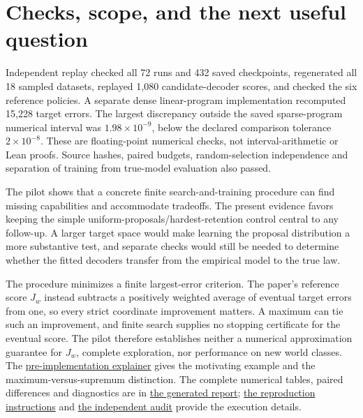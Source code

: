 \documentclass[11pt]{article}
\begin{document}
\section{Checks, scope, and the next useful question}

Independent replay checked all 72 runs and 432 saved checkpoints, regenerated
all 18 sampled datasets, replayed 1,080 candidate-decoder scores, and checked the
six reference policies. A separate dense linear-program implementation
recomputed 15,228 target errors. The largest discrepancy outside the saved
sparse-program numerical interval was $1.98\times10^{-9}$, below the declared
comparison tolerance $2\times10^{-8}$. These are floating-point numerical
checks, not interval-arithmetic or Lean proofs. Source hashes, paired budgets,
random-selection independence and separation of training from true-model
evaluation also passed.

The pilot shows that a concrete finite search-and-training procedure can find
missing capabilities and accommodate tradeoffs. The present evidence favors
keeping the simple uniform-proposals/hardest-retention control central to any
follow-up. A larger target space would make learning the proposal distribution
a more substantive test, and separate checks would still be needed to determine
whether the fitted decoders transfer from the empirical model to the true law.

The procedure minimizes a finite largest-error criterion. The paper's reference
score $J_w$ instead subtracts a positively weighted average of eventual target
errors from one, so every strict coordinate improvement matters. A maximum can
tie such an improvement, and
finite search supplies no stopping certificate for the eventual score. The
pilot therefore establishes neither a numerical approximation guarantee for
$J_w$, complete exploration, nor performance on new world classes. The
\href{EXPLAINER.pdf}{pre-implementation explainer} gives the motivating example
and the maximum-versus-supremum distinction. The complete numerical tables,
paired differences and diagnostics are in
\href{main/report/RESULTS.md}{the generated report};
\href{REPRODUCE.txt}{the reproduction instructions} and
\href{AUDIT.txt}{the independent audit} provide the execution details.
\end{document}
